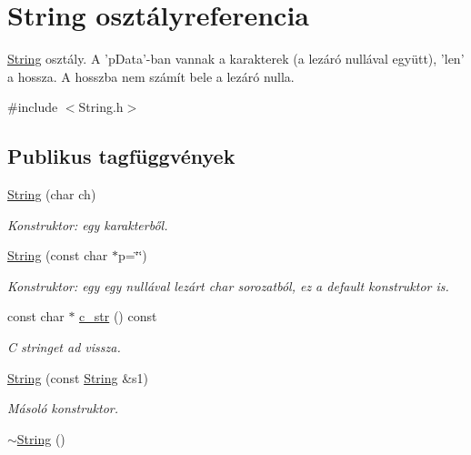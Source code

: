 \hypertarget{class_string}{\section{String osztályreferencia}
\label{class_string}
}


\hyperlink{class_string}{String} osztály. A 'p\-Data'-\/ban vannak a karakterek (a lezáró nullával együtt), 'len' a hossza. A hosszba nem számít bele a lezáró nulla.  




{\ttfamily \#include $<$String.\-h$>$}

\subsection*{Publikus tagfüggvények}
\begin{DoxyCompactItemize}
\item 
\hyperlink{class_string_a62a77180f8df2547e8be1313654abcee}{String} (char ch)
\begin{DoxyCompactList}\small\item\em Konstruktor\-: egy karakterből. \end{DoxyCompactList}\item 
\hyperlink{class_string_a50babe8c612a7978a61118a220517e6b}{String} (const char $\ast$p=\char`\"{}\char`\"{})
\begin{DoxyCompactList}\small\item\em Konstruktor\-: egy egy nullával lezárt char sorozatból, ez a default konstruktor is. \end{DoxyCompactList}\item 
const char $\ast$ \hyperlink{class_string_a4d236d8f9b907db1822064fe0037e267}{c\-\_\-str} () const 
\begin{DoxyCompactList}\small\item\em C stringet ad vissza. \end{DoxyCompactList}\item 
\hyperlink{class_string_a3c682dc983b45bdbb7f3858fe4cbf221}{String} (const \hyperlink{class_string}{String} \&s1)
\begin{DoxyCompactList}\small\item\em Másoló konstruktor. \end{DoxyCompactList}\item 
\hypertarget{class_string_ac40b2a3fb58c2d8556f5e6ff73510036}{\hyperlink{class_string_ac40b2a3fb58c2d8556f5e6ff73510036}{$\sim$\-String} ()}\label{class_string_ac40b2a3fb58c2d8556f5e6ff73510036}


\end{DoxyCompactItemize}
